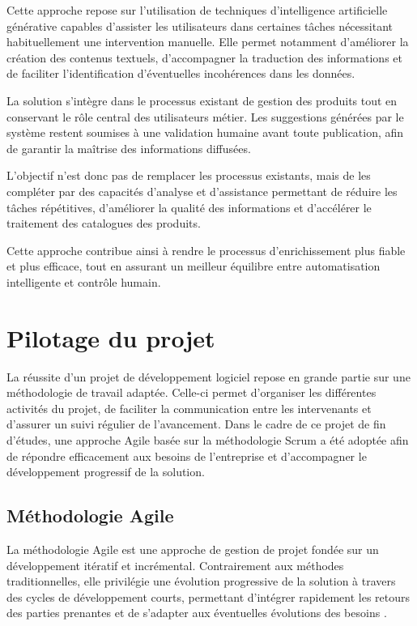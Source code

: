 Cette approche repose sur l'utilisation de techniques d'intelligence artificielle générative capables d'assister les utilisateurs dans certaines tâches nécessitant habituellement une intervention manuelle. Elle permet notamment d'améliorer la création des contenus textuels, d'accompagner la traduction des informations et de faciliter l'identification d'éventuelles incohérences dans les données.

La solution s'intègre dans le processus existant de gestion des produits tout en conservant le rôle central des utilisateurs métier. Les suggestions générées par le système restent soumises à une validation humaine avant toute publication, afin de garantir la maîtrise des informations diffusées.

L'objectif n'est donc pas de remplacer les processus existants, mais de les compléter par des capacités d'analyse et d'assistance permettant de réduire les tâches répétitives, d'améliorer la qualité des informations et d'accélérer le traitement des catalogues des produits.

Cette approche contribue ainsi à rendre le processus d'enrichissement plus fiable et plus efficace, tout en assurant un meilleur équilibre entre automatisation intelligente et contrôle humain.







\section{Pilotage du projet}

La réussite d'un projet de développement logiciel repose en grande partie sur une méthodologie de travail adaptée. Celle-ci permet d'organiser les différentes activités du projet, de faciliter la communication entre les intervenants et d'assurer un suivi régulier de l'avancement. Dans le cadre de ce projet de fin d'études, une approche Agile basée sur la méthodologie Scrum a été adoptée afin de répondre efficacement aux besoins de l'entreprise et d'accompagner le développement progressif de la solution.

\subsection{Méthodologie Agile}

La méthodologie Agile est une approche de gestion de projet fondée sur un développement itératif et incrémental. Contrairement aux méthodes traditionnelles, elle privilégie une évolution progressive de la solution à travers des cycles de développement courts, permettant d'intégrer rapidement les retours des parties prenantes et de s'adapter aux éventuelles évolutions des besoins .

